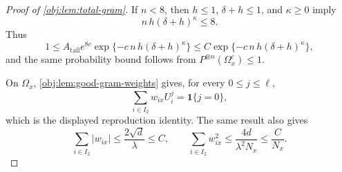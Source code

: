 \begin{proof}[Proof of \cref{obj:lem:total-gram}]
If \(n<8\), then \(h\le1\), \(\delta+h\le1\), and \(\kappa\ge0\) imply
\[
n\,h(\delta+h)^\kappa\le8.
\]
Thus
\[
1\le
A_{\mathrm{tail}}e^{8c}\exp\{-c\,n\,h(\delta+h)^\kappa\}
\le
C\exp\{-c\,n\,h(\delta+h)^\kappa\},
\]
and the same probability bound follows from \(P^{\otimes n}(\Omega_x^c)\le1\). %

On \(\Omega_x\), \cref{obj:lem:good-gram-weights} gives, for every \(0\le j\le\ell\),
\[
\sum_{i\in I_2}w_{ix}U_i^j
=
\mathbf 1\{j=0\},
\]
which is the displayed reproduction identity.  The same result also gives
\[
\sum_{i\in I_2}|w_{ix}|
\le
\frac{2\sqrt d}{\lambda}
\le C,
\qquad
\sum_{i\in I_2}w_{ix}^2
\le
\frac{4d}{\lambda^2N_x}
\le
\frac{C}{N_x}.
\]
\end{proof}
